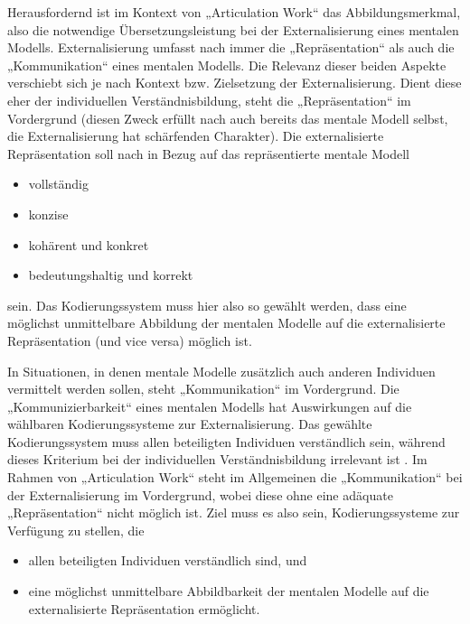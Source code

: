 Herausfordernd ist im Kontext von „Articulation Work“ das Abbildungsmerkmal, also die notwendige Übersetzungsleistung bei der Externalisierung eines mentalen Modells. Externalisierung umfasst nach \citet{Hanke06} immer die „Repräsentation“ als auch die „Kommunikation“ eines mentalen Modells. Die Relevanz dieser beiden Aspekte verschiebt sich je nach Kontext bzw. Zielsetzung der Externalisierung. Dient diese eher der individuellen Verständnisbildung, steht die „Repräsentation“ im Vordergrund (diesen Zweck erfüllt nach \citep{Seel91} auch bereits das mentale Modell selbst, die Externalisierung hat schärfenden Charakter). Die externalisierte Repräsentation soll nach \citet[][S. 187]{Seel91} in Bezug auf das repräsentierte mentale Modell
\begin{itemize}
	\item vollständig 
	\item konzise
	\item kohärent und konkret
	\item bedeutungshaltig und korrekt
\end{itemize}
sein. Das Kodierungssystem muss hier also so gewählt werden, dass eine möglichst unmittelbare Abbildung der mentalen Modelle auf die externalisierte Repräsentation (und vice versa) möglich ist. 

In Situationen, in denen mentale Modelle zusätzlich auch anderen Individuen vermittelt werden sollen, steht „Kommunikation“ im Vordergrund. Die „Kommunizierbarkeit“ eines mentalen Modells hat Auswirkungen auf die wählbaren Kodierungssysteme zur Externalisierung. Das gewählte Kodierungssystem muss allen beteiligten Individuen verständlich sein, während dieses Kriterium bei der individuellen Verständnisbildung irrelevant ist \citep{Hanke06}. Im Rahmen von „Articulation Work“ steht im Allgemeinen die „Kommunikation“ bei der Externalisierung im Vordergrund, wobei diese ohne eine adäquate „Repräsentation“ nicht möglich ist. \label{anforderungen_seel} Ziel muss es also sein, Kodierungssysteme zur Verfügung zu stellen, die 
\begin{itemize}
	\item allen beteiligten Individuen verständlich sind, und
	\item eine möglichst unmittelbare Abbildbarkeit der mentalen Modelle auf die externalisierte Repräsentation ermöglicht.
\end{itemize}

